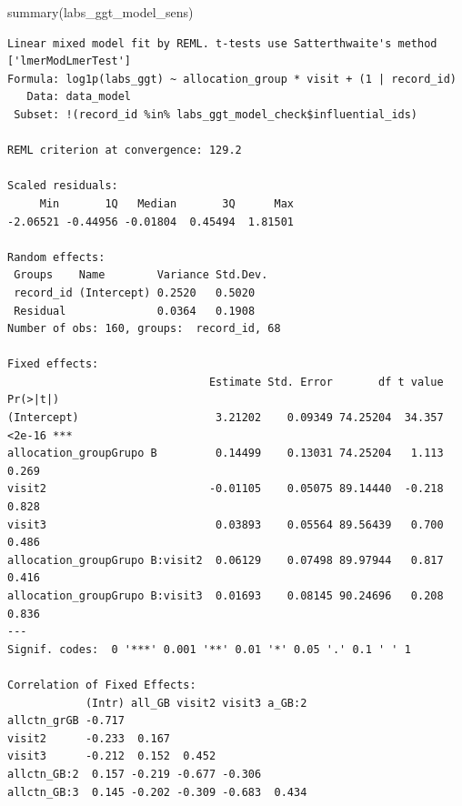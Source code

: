 \documentclass[
  12pt,
]{article}
\newenvironment{Shaded}{\begin{snugshade}}{\end{snugshade}}
\newcommand{\FunctionTok}[1]{\textcolor[rgb]{0.28,0.35,0.67}{#1}}
\newcommand{\NormalTok}[1]{\textcolor[rgb]{0.00,0.23,0.31}{#1}}
\newcommand{\SpecialCharTok}[1]{\textcolor[rgb]{0.37,0.37,0.37}{#1}}
\begin{document}
\begin{Shaded}
\begin{Highlighting}[]
\FunctionTok{summary}\NormalTok{(labs\_ggt\_model\_sens)}
\end{Highlighting}
\end{Shaded}

\begin{verbatim}
Linear mixed model fit by REML. t-tests use Satterthwaite's method ['lmerModLmerTest']
Formula: log1p(labs_ggt) ~ allocation_group * visit + (1 | record_id)
   Data: data_model
 Subset: !(record_id %in% labs_ggt_model_check$influential_ids)

REML criterion at convergence: 129.2

Scaled residuals: 
     Min       1Q   Median       3Q      Max 
-2.06521 -0.44956 -0.01804  0.45494  1.81501 

Random effects:
 Groups    Name        Variance Std.Dev.
 record_id (Intercept) 0.2520   0.5020  
 Residual              0.0364   0.1908  
Number of obs: 160, groups:  record_id, 68

Fixed effects:
                               Estimate Std. Error       df t value Pr(>|t|)    
(Intercept)                     3.21202    0.09349 74.25204  34.357   <2e-16 ***
allocation_groupGrupo B         0.14499    0.13031 74.25204   1.113    0.269    
visit2                         -0.01105    0.05075 89.14440  -0.218    0.828    
visit3                          0.03893    0.05564 89.56439   0.700    0.486    
allocation_groupGrupo B:visit2  0.06129    0.07498 89.97944   0.817    0.416    
allocation_groupGrupo B:visit3  0.01693    0.08145 90.24696   0.208    0.836    
---
Signif. codes:  0 '***' 0.001 '**' 0.01 '*' 0.05 '.' 0.1 ' ' 1

Correlation of Fixed Effects:
            (Intr) all_GB visit2 visit3 a_GB:2
allctn_grGB -0.717                            
visit2      -0.233  0.167                     
visit3      -0.212  0.152  0.452              
allctn_GB:2  0.157 -0.219 -0.677 -0.306       
allctn_GB:3  0.145 -0.202 -0.309 -0.683  0.434
\end{verbatim}

\begin{Shaded}
\end{Shaded}
\end{document}

